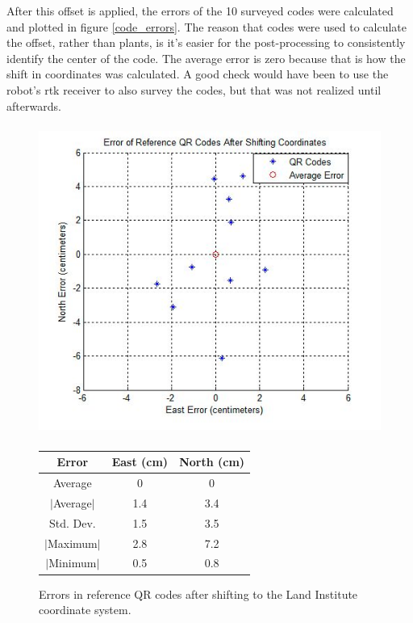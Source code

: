 After this offset is applied, the errors of the 10 surveyed codes were calculated and plotted in figure \ref{code_errors}.  The reason that codes were used to calculate the offset, rather than plants, is it's easier for the post-processing to consistently identify the center of the code.  The average error is zero because that is how the shift in coordinates was calculated.  A good check would have been to use the robot's \ac{rtk} receiver to also survey the codes, but that was not realized until afterwards.

  \begin{figure}
	\centering
    \includegraphics[height=4in]{figures/code_errors.jpg}
    \label{figure:code_errors}
    \newline
    \newline
    \centering
    \begin{tabular}[c]{|c|c|c|}
       \hline
        Error & East (cm) & North (cm) \\ 
        \hline
        Average   & 0 & 0             \\
        $|$Average$|$ & 1.4 & 3.4       \\
        Std. Dev. & 1.5 & 3.5         \\
        $|$Maximum$|$   & 2.8 & 7.2       \\
        $|$Minimum$|$   & 0.5 & 0.8       \\
        \hline
    \end{tabular}
    \captionsetup{labelformat=andtable}
    \caption{Errors in reference QR codes after shifting to the Land Institute coordinate system.}
  \end{figure}

